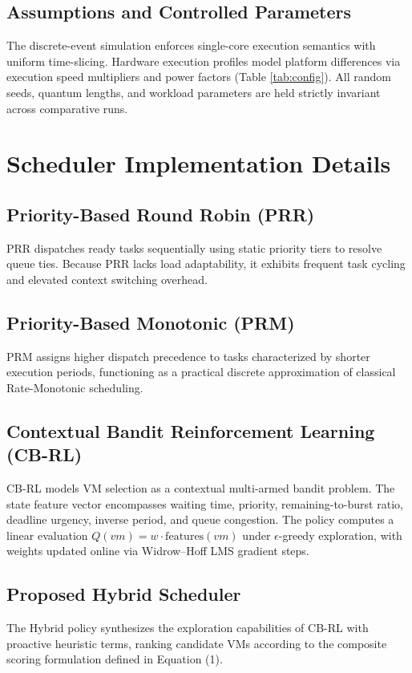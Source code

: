\documentclass[conference]{IEEEtran}
\begin{document}
\subsection{Assumptions and Controlled Parameters}
The discrete-event simulation enforces single-core execution semantics with uniform time-slicing. Hardware execution profiles model platform differences via execution speed multipliers and power factors (Table \ref{tab:config}). All random seeds, quantum lengths, and workload parameters are held strictly invariant across comparative runs.

\section{Scheduler Implementation Details}
\subsection{Priority-Based Round Robin (PRR)}
PRR dispatches ready tasks sequentially using static priority tiers to resolve queue ties. Because PRR lacks load adaptability, it exhibits frequent task cycling and elevated context switching overhead.

\subsection{Priority-Based Monotonic (PRM)}
PRM assigns higher dispatch precedence to tasks characterized by shorter execution periods, functioning as a practical discrete approximation of classical Rate-Monotonic scheduling.

\subsection{Contextual Bandit Reinforcement Learning (CB-RL)}
CB-RL models VM selection as a contextual multi-armed bandit problem. The state feature vector encompasses waiting time, priority, remaining-to-burst ratio, deadline urgency, inverse period, and queue congestion. The policy computes a linear evaluation $Q(vm) = w \cdot \mathrm{features}(vm)$ under $\epsilon$-greedy exploration, with weights updated online via Widrow--Hoff LMS gradient steps.

\subsection{Proposed Hybrid Scheduler}
The Hybrid policy synthesizes the exploration capabilities of CB-RL with proactive heuristic terms, ranking candidate VMs according to the composite scoring formulation defined in Equation (1).
\end{document}
